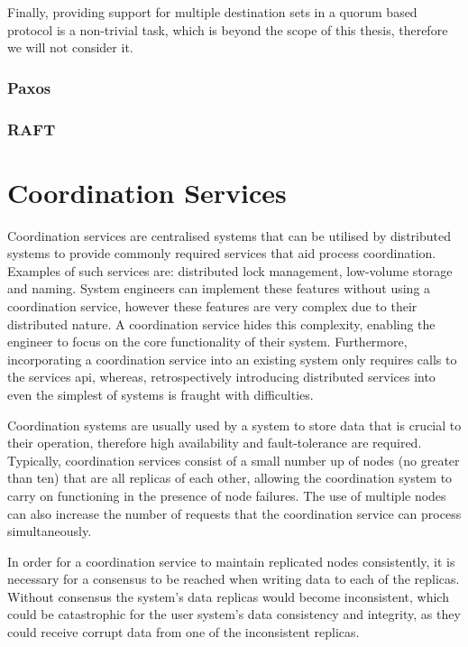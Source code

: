 	Finally, providing support for multiple destination sets in a quorum based protocol is a non-trivial task, which is beyond the scope of this thesis, therefore we will not consider it.  
		\subsubsection{Paxos}
		\subsubsection{RAFT}		
	

\section{Coordination Services}
Coordination services are centralised systems that can be utilised by distributed systems to provide commonly required services that aid process coordination. Examples of such services are: distributed lock management, low-volume storage and naming. System engineers can implement these features without using a coordination service, however these features are very complex due to their distributed nature. A coordination service hides this complexity, enabling the engineer to focus on the core functionality of their system. Furthermore, incorporating a coordination service into an existing system only requires calls to the services api, whereas, retrospectively introducing distributed services into even the simplest of systems is fraught with difficulties. 

Coordination systems are usually used by a system to store data that is crucial to their operation, therefore high availability and fault-tolerance are required. Typically, coordination services consist of a small number up of nodes (no greater than ten) that are all replicas of each other, allowing the coordination system to carry on functioning in the presence of node failures. The use of multiple nodes can also increase the number of requests that the coordination service can process simultaneously. 

In order for a coordination service to maintain replicated nodes consistently, it is necessary for a consensus to be reached when writing data to each of the replicas. Without consensus the system's data replicas would become inconsistent, which could be catastrophic for the user system's data consistency and integrity, as they could receive corrupt data from one of the inconsistent replicas. 

